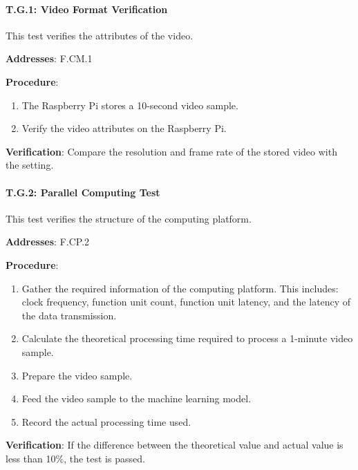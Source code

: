\paragraph{T.G.1: Video Format Verification}

This test verifies the attributes of the video.

\textbf{Addresses}: F.CM.1

\textbf{Procedure}:
\begin{enumerate}[noitemsep]
    \item The Raspberry Pi stores a 10-second video sample.
    \item Verify the video attributes on the Raspberry Pi.
\end{enumerate}

\textbf{Verification}: 
Compare the resolution and frame rate of the stored video with the setting.

%

\paragraph{T.G.2: Parallel Computing Test}

This test verifies the structure of the computing platform.

\textbf{Addresses}: F.CP.2

\textbf{Procedure}:
\begin{enumerate}[noitemsep]
    \item Gather the required information of the computing platform. This includes: clock frequency, function unit count, function unit latency, and the latency of the data transmission.
    \item Calculate the theoretical processing time required to process a 1-minute video sample.
    \item Prepare the video sample.
    \item Feed the video sample to the machine learning model.
    \item Record the actual processing time used.
\end{enumerate}

\textbf{Verification}: 
If the difference between the theoretical value and actual value is less than 10\%, the test is passed. 
